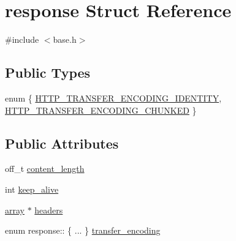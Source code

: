 \hypertarget{structresponse}{\section{response Struct Reference}
\label{structresponse}
}


{\ttfamily \#include $<$base.\-h$>$}

\subsection*{Public Types}
\begin{DoxyCompactItemize}
\item 
enum \{ \hyperlink{structresponse_a3b55892e3070294bd7626c1f9f9c6a1ea681377ff8deef8842452fdde92f62d25}{H\-T\-T\-P\-\_\-\-T\-R\-A\-N\-S\-F\-E\-R\-\_\-\-E\-N\-C\-O\-D\-I\-N\-G\-\_\-\-I\-D\-E\-N\-T\-I\-T\-Y}, 
\hyperlink{structresponse_a3b55892e3070294bd7626c1f9f9c6a1ea98aac1bb95c21a65d732fb9a0188b15b}{H\-T\-T\-P\-\_\-\-T\-R\-A\-N\-S\-F\-E\-R\-\_\-\-E\-N\-C\-O\-D\-I\-N\-G\-\_\-\-C\-H\-U\-N\-K\-E\-D}
 \}
\end{DoxyCompactItemize}
\subsection*{Public Attributes}
\begin{DoxyCompactItemize}
\item 
off\-\_\-t \hyperlink{structresponse_a456f39b320e790dada596bf45139daaa}{content\-\_\-length}
\item 
int \hyperlink{structresponse_af13edeff2f67025a2edbdd9d48d2b6df}{keep\-\_\-alive}
\item 
\hyperlink{structarray}{array} $\ast$ \hyperlink{structresponse_acdd8b44049b5d416df88a1503deffc40}{headers}
\item 
enum response\-:: \{ ... \}  \hyperlink{structresponse_adcf8491ba3102f920d8bcb8666374d01}{transfer\-\_\-encoding}
\end{DoxyCompactItemize}


